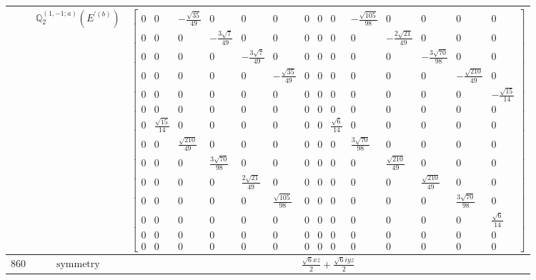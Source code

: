 \documentclass[fleqn,8pt,landscape]{jsarticle}
\begin{document}
\begin{longtable}{ccc}
$  $ & $ \mathbb{Q}_{2}^{(1,-1;a)}(E^{\prime(b)}) $ & $ \begin{bmatrix} 0 & 0 & - \frac{\sqrt{35}}{49} & 0 & 0 & 0 & 0 & 0 & 0 & - \frac{\sqrt{105}}{98} & 0 & 0 & 0 & 0 \\ 0 & 0 & 0 & - \frac{3 \sqrt{7}}{49} & 0 & 0 & 0 & 0 & 0 & 0 & - \frac{2 \sqrt{21}}{49} & 0 & 0 & 0 \\ 0 & 0 & 0 & 0 & - \frac{3 \sqrt{7}}{49} & 0 & 0 & 0 & 0 & 0 & 0 & - \frac{3 \sqrt{70}}{98} & 0 & 0 \\ 0 & 0 & 0 & 0 & 0 & - \frac{\sqrt{35}}{49} & 0 & 0 & 0 & 0 & 0 & 0 & - \frac{\sqrt{210}}{49} & 0 \\ 0 & 0 & 0 & 0 & 0 & 0 & 0 & 0 & 0 & 0 & 0 & 0 & 0 & - \frac{\sqrt{15}}{14} \\ 0 & 0 & 0 & 0 & 0 & 0 & 0 & 0 & 0 & 0 & 0 & 0 & 0 & 0 \\ 0 & \frac{\sqrt{15}}{14} & 0 & 0 & 0 & 0 & 0 & 0 & \frac{\sqrt{6}}{14} & 0 & 0 & 0 & 0 & 0 \\ 0 & 0 & \frac{\sqrt{210}}{49} & 0 & 0 & 0 & 0 & 0 & 0 & \frac{3 \sqrt{70}}{98} & 0 & 0 & 0 & 0 \\ 0 & 0 & 0 & \frac{3 \sqrt{70}}{98} & 0 & 0 & 0 & 0 & 0 & 0 & \frac{\sqrt{210}}{49} & 0 & 0 & 0 \\ 0 & 0 & 0 & 0 & \frac{2 \sqrt{21}}{49} & 0 & 0 & 0 & 0 & 0 & 0 & \frac{\sqrt{210}}{49} & 0 & 0 \\ 0 & 0 & 0 & 0 & 0 & \frac{\sqrt{105}}{98} & 0 & 0 & 0 & 0 & 0 & 0 & \frac{3 \sqrt{70}}{98} & 0 \\ 0 & 0 & 0 & 0 & 0 & 0 & 0 & 0 & 0 & 0 & 0 & 0 & 0 & \frac{\sqrt{6}}{14} \\ 0 & 0 & 0 & 0 & 0 & 0 & 0 & 0 & 0 & 0 & 0 & 0 & 0 & 0 \\ 0 & 0 & 0 & 0 & 0 & 0 & 0 & 0 & 0 & 0 & 0 & 0 & 0 & 0 \end{bmatrix} $ \\ \hline
$ 860 $ & $ \text{symmetry} $ & $ \frac{\sqrt{6} x z}{2} + \frac{\sqrt{6} i y z}{2} $ \\

\end{longtable}
\end{document}
